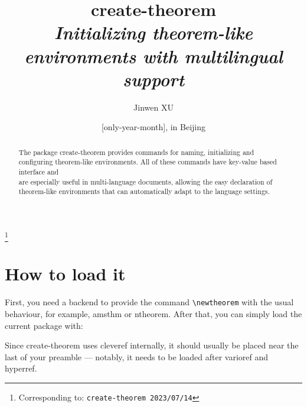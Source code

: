 \documentclass[classical]{einfart}
\newcommand{\meta}[1]{$\langle${\normalfont\itshape#1}$\rangle$}
\newenvironment{tip}[1][Tip]
  {%
    \LocallyStopLineNumbers%
    \begin{tcolorbox}[breakable,
        enhanced,
        width = \textwidth,
        colback = paper, colbacktitle = paper,
        colframe = gray!50, boxrule=0.2mm,
        coltitle = black,
        fonttitle = \sffamily,
        attach boxed title to top left = {yshift=-\tcboxedtitleheight/2, xshift=.5cm},
        boxed title style = {boxrule=0pt, colframe=paper},
        before skip = 3mm,
        after skip = 3mm,
        top = 2.5mm,
        bottom = 1.5mm,
        title={\scshape\sffamily #1}]%
  }
  {%
    \end{tcolorbox}%
    \ResumeLineNumbers%
  }
\newcommand{\createtheorempackage}{\textsf{create-theorem}}
\begin{document}
\def\PackageVersion{2023/07/14}
\def\PackageSubVersion{}

\title{\createtheorempackage{}\\\smallskip\itshape Initializing theorem-like environments with multilingual support}
\author{Jinwen XU}
\thanks{Corresponding to: \texttt{\createtheorempackage{} \PackageVersion\PackageSubVersion}}
\date{\TheDate{\PackageVersion}[only-year-month], in Beijing}

\maketitle

\begin{abstract}
    \raggedleft
    The package \createtheorempackage{} provides commands for naming, initializing and configuring theorem-like environments. All of these commands have key-value based interface and \\are especially useful in multi-language documents, allowing the easy declaration of \\theorem-like environments that can automatically adapt to the language settings.
\end{abstract}

\vspace{-.5\baselineskip}



\section{How to load it}

First, you need a backend to provide the command \lstinline|\newtheorem| with the usual behaviour, for example, \textsf{amsthm} or \textsf{ntheorem}. After that, you can simply load the current package with:

\begin{code}
\usepackage[(*\meta{options}*)]{create-theorem}
\end{code}

\begin{tip}[Attention]
    Since \createtheorempackage{} uses \textsf{cleveref} internally, it should usually be placed near the last of your preamble --- notably, it needs to be loaded after \textsf{varioref} and \textsf{hyperref}.
\end{tip}
\end{document}

